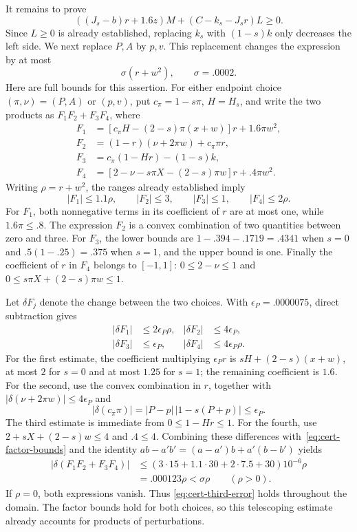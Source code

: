 It remains to prove
\begin{equation}
 ((J_s-b)r+1.6z)M+(C-k_s-J_sr)L\ge0.
 \label{eq:cert-third-goal}
\end{equation}
Since $L\ge0$ is already established, replacing $k_s$ with $(1-s)k$
only decreases the left side.  We next replace $P,A$ by $p,v$.
This replacement changes the expression by at most
\begin{equation}
 \sigma(r+w^2),\qquad \sigma=.0002.
 \label{eq:cert-third-error}
\end{equation}
Here are full bounds for this assertion.  For either endpoint choice
$(\pi,\nu)=(P,A)$ or $(p,v)$, put $c_\pi=1-s\pi$, $H=H_s$, and
write the two products as $F_1F_2+F_3F_4$, where
\begin{align*}
 F_1&=[c_\pi H-(2-s)\pi(x+w)]r+1.6\pi w^2,\\
 F_2&=(1-r)(\nu+2\pi w)+c_\pi\pi r,\\
 F_3&=c_\pi(1-Hr)-(1-s)k,\\
 F_4&=[2-\nu-s\pi X-(2-s)\pi w]r+.4\pi w^2.
\end{align*}
Writing $\rho=r+w^2$, the ranges already established imply
\begin{equation}
 |F_1|\le1.1\rho,\qquad |F_2|\le3,\qquad
 |F_3|\le1,\qquad |F_4|\le2\rho.
 \label{eq:cert-factor-bounds}
\end{equation}
For $F_1$, both nonnegative terms in its coefficient of $r$ are at
most one, while $1.6\pi\le.8$.  The expression $F_2$ is a convex
combination of two quantities between zero and three.  For $F_3$,
the lower bounds are $1-.394-.1719=.4341$ when $s=0$ and
$.5(1-.25)=.375$ when $s=1$, and the upper bound is one.
Finally the coefficient of $r$ in $F_4$ belongs to $[-1,1]$:
$0\le2-\nu\le1$ and $0\le s\pi X+(2-s)\pi w\le1$.

Let $\delta F_j$ denote the change between the two choices.  With
$\epsilon_P=.0000075$, direct subtraction gives
\begin{align*}
 |\delta F_1|&\le2\epsilon_P\rho,&
 |\delta F_2|&\le4\epsilon_P,\\
 |\delta F_3|&\le\epsilon_P,&
 |\delta F_4|&\le4\epsilon_P\rho.
\end{align*}
For the first estimate, the coefficient multiplying
$\epsilon_Pr$ is $sH+(2-s)(x+w)$, at most $2$ for $s=0$ and at
most $1.25$ for $s=1$; the remaining coefficient is $1.6$.
For the second, use the convex combination in $r$, together with
$|\delta(\nu+2\pi w)|\le4\epsilon_P$ and
\[
 |\delta(c_\pi\pi)|
   =|P-p|\,|1-s(P+p)|\le\epsilon_P.
\]
The third estimate is immediate from $0\le1-Hr\le1$.
For the fourth, use
$2+sX+(2-s)w\le4$ and $.4\le4$.
Combining these differences with~\eqref{eq:cert-factor-bounds} and
the identity $ab-a'b'=(a-a')b+a'(b-b')$ yields
\begin{align*}
 |\delta(F_1F_2+F_3F_4)|
 &\le(3\cdot15+1.1\cdot30+2\cdot7.5+30)10^{-6}\rho\\
 &=.000123\rho<\sigma\rho\qquad(\rho>0).
\end{align*}
If $\rho=0$, both expressions vanish.  Thus
\eqref{eq:cert-third-error} holds throughout the domain.  The factor
bounds hold for both choices, so this telescoping estimate already
accounts for products of perturbations.

